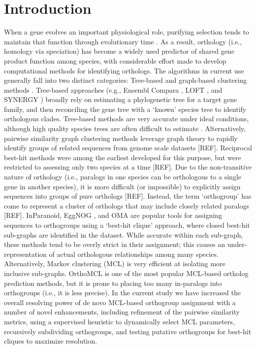 \documentclass[nogrid]{MBE}%
\begin{document}
\section{{Introduction}\label{sec:Intro}}
When a gene evolves an important physiological role, purifying selection tends to maintain that function through evolutionary time \cite{Altenhoff:2012ea}. As a result, orthology (i.e., homology via speciation) has become a widely used predictor of shared gene product function among species, with considerable effort made to develop computational methods for identifying orthologs. The algorithms in current use generally fall into two distinct categories: Tree-based and graph-based clustering methods \cite{Tekaia:2016ga}. Tree-based approaches (e.g., Ensembl Compara \cite{Vilella:2009ju}, LOFT \cite{vanderHeijden:2007bo}, and SYNERGY \cite{Wapinski:2007fa}) broadly rely on estimating a phylogenetic tree for a target gene family, and then reconciling the gene tree with a `known' species tree to identify orthologous clades. Tree-based methods are very accurate under ideal conditions, although high quality species trees are often difficult to estimate \cite{Xu:2016ek}. Alternatively, pairwise similarity graph clustering methods leverage graph theory to rapidly identify groups of related sequences from genome scale datasets [REF]. Reciprocal best-hit methods were among the earliest developed for this purpose, but were restricted to assessing only two species at a time [REF]. Due to the non-transitive nature of orthology (i.e., paralogs in one species can be orthologous to a single gene in another species), it is more difficult (or impossible) to explicitly assign sequences into groups of pure orthologs [REF]. Instead, the term `orthogroup' has come to represent a cluster of orthologs that may include closely related paralogs [REF]. InParanoid, EggNOG \cite{Jensen:2007cc}, and OMA \cite{Roth:2009iu} are popular tools for assigning sequences to orthogroups using a `best-hit clique' approach, where closed best-hit sub-graphs are identified in the dataset. While accurate within each sub-graph, these methods tend to be overly strict in their assignment; this causes an under-representation of actual orthologous relationships among many species. Alternatively, Markov clustering (MCL) is very efficient at isolating more inclusive sub-graphs. OrthoMCL is one of the most popular MCL-based ortholog prediction methods, but it is prone to placing too many in-paralogs into orthogroups (i.e., it is less precise). In the current study we have increased the overall resolving power of de novo MCL-based orthogroup assignment with a number of novel enhancements, including refinement of the pairwise similarity metrics, using a supervised heuristic to dynamically select MCL parameters, recursively subdividing orthogroups, and testing putative orthogroups for best-hit cliques to maximize resolution.
\end{document}

